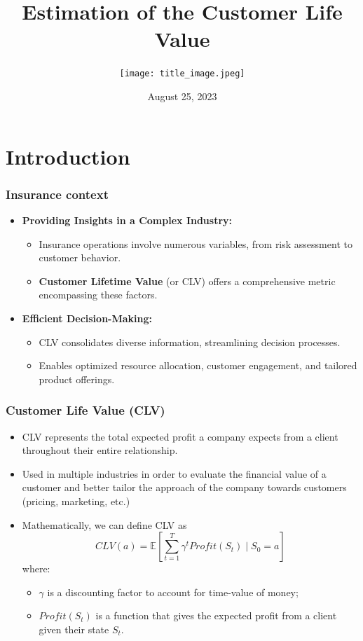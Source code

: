 \documentclass[aspectratio=169,xcolor=x11names,compress]{beamer}
\title{Estimation of the Customer Life Value}
\author{\texttt{[image: title\_image.jpeg]}}
\date{August 25, 2023}
\newcommand{\E}{\mathbb{E}}
\begin{document}
\maketitle


\section{Introduction}

\begin{frame}
\frametitle{Insurance context}

\begin{itemize}
  \item \textbf{Providing Insights in a Complex Industry:}
  \begin{itemize}
    \item Insurance operations involve numerous variables, from risk assessment to customer behavior.
    \item \textbf{Customer Lifetime Value} (or CLV) offers a comprehensive metric encompassing these factors.
  \end{itemize}
  
  \item \textbf{Efficient Decision-Making:}
  \begin{itemize}
    \item CLV consolidates diverse information, streamlining decision processes.
    \item Enables optimized resource allocation, customer engagement, and tailored product offerings.
  \end{itemize}
\end{itemize}

\end{frame}

\begin{frame}
\frametitle{Customer Life Value (CLV)}

\begin{itemize}
    \item CLV represents the total expected profit a
    company expects from a client throughout their entire relationship.
    \item Used in multiple industries in order to evaluate the financial value of a
    customer and better tailor the approach of the company towards
    customers (pricing, marketing, etc.) 

\item Mathematically, we can define CLV as
\[
CLV(a) = \E\left[\sum_{t=1}^T \gamma^t Profit(S_t)\mid S_0 = a\right]
\]
where:
\begin{itemize}
    \item $\gamma$ is a discounting factor to account for time-value of money;
    \item $Profit(S_t)$ is a function that gives the expected profit from a client given their state $S_t$.
\end{itemize}

\end{itemize}
\end{frame}
\end{document}
